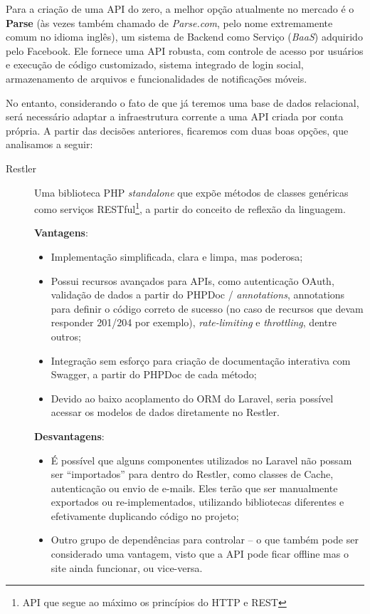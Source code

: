 \documentclass[12pt,a4paper,twoside,hyphens,english,brazil]{abntex2}
\begin{document}
{Para a criação de uma API do zero, a melhor opção atualmente no mercado é o \textbf{Parse} (às vezes também chamado de \emph{Parse.com}, pelo nome extremamente comum no idioma inglês), um sistema de Backend como Serviço (\textit{BaaS}) adquirido pelo Facebook\cite{facebook-buys-parse}. Ele fornece uma API robusta, com controle de acesso por usuários e execução de código customizado, sistema integrado de login social, armazenamento de arquivos e funcionalidades de notificações móveis.

No entanto, considerando o fato de que já teremos uma base de dados relacional, será necessário adaptar a infraestrutura corrente a uma API criada por conta própria. A partir das decisões anteriores, ficaremos com duas boas opções, que analisamos a seguir:
\begin{description}
	\item[Restler]
		Uma biblioteca PHP \emph{standalone} que expõe métodos de classes genéricas como serviços RESTful\footnote{API que segue ao máximo os princípios do HTTP e REST}, a partir do conceito de reflexão da linguagem.
		
		\textbf{Vantagens}:
		\begin{itemize}[itemsep=-1ex]
			\item Implementação simplificada, clara e limpa, mas poderosa;
			\item Possui recursos avançados para APIs, como autenticação OAuth, validação de dados a partir do PHPDoc\footnotemark{} / \emph{annotations}, annotations para definir o código correto de sucesso (no caso de recursos que devam responder 201/204 por exemplo), \emph{rate-limiting} e \emph{throttling}, dentre outros;
			\item Integração sem esforço para criação de documentação interativa com Swagger\footnotemark{}, a partir do PHPDoc de cada método;
			\item Devido ao baixo acoplamento do ORM do Laravel, seria possível acessar os modelos de dados diretamente no Restler.
		\end{itemize}
		
		\textbf{Desvantagens}:
		\begin{itemize}[itemsep=-1ex]
			\item É possível que alguns componentes utilizados no Laravel não possam ser ``importados'' para dentro do Restler, como classes de Cache, autenticação ou envio de e-mails. Eles terão que ser manualmente exportados ou re-implementados, utilizando bibliotecas diferentes e efetivamente duplicando código no projeto;
			\item Outro grupo de dependências para controlar -- o que também pode ser considerado uma vantagem, visto que a API pode ficar offline mas o site ainda funcionar, ou vice-versa.
		\end{itemize}
	

\end{description}}
\end{document}
